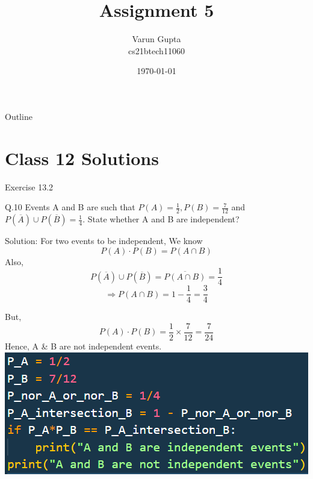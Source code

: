 \documentclass{beamer}
\title{Assignment 5}
\author{Varun Gupta \\ cs21btech11060}
\date{\today}
\begin{document}
\begin{frame}
    \titlepage 
\end{frame}

\logo{}


\begin{frame}{Outline}
    \tableofcontents
\end{frame}

\section{Class 12 Solutions}
\begin{frame}{Exercise 13.2}
    \begin{block}{Q.10}
        Events A and B are such that $P(A) = \frac{1}{2}, P(B) = \frac{7}{12}$ and $P(\overline{A}) \cup P(\overline{B}) = \frac{1}{4}$. State whether A and B are independent?
    \end{block}
    \begin{block}{Solution:}
        For two events to be independent, We know
        \begin{equation}
            P(A) \cdot P(B) = P(A \cap B)
        \end{equation}
        Also,
        \begin{equation}
            P(\overline{A}) \cup P(\overline{B}) = \overline{P(A \cap B)} = \frac{1}{4}
        \end{equation}
        \begin{equation}
            \Rightarrow P(A \cap B) = 1-\frac{1}{4} = \frac{3}{4}
        \end{equation}
    \end{block}
\end{frame}
\begin{frame}
        But,
        \begin{equation}
            P(A) \cdot P(B) = \frac{1}{2} \times \frac{7}{12} = \frac{7}{24}
        \end{equation}
        Hence, A \& B are not independent events.
        \includegraphics{figures/fig.png}
\end{frame}
\end{document}
